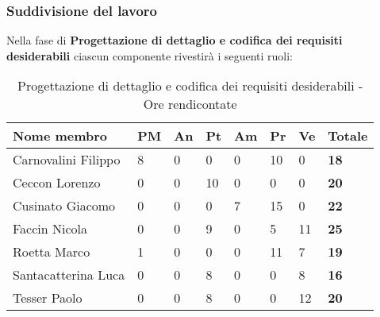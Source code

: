 		\subsubsection{Suddivisione del lavoro} %
		\label{ssub:suddivisione_del_lavoro}
		Nella fase di \textbf{Progettazione di dettaglio e codifica dei requisiti desiderabili} ciascun componente rivestirà i seguenti ruoli: \\
			\begin{table}[!h]
				\begin{center}
					\begin{tabularx}{0.9\textwidth}{|l|l|l|l|l|l|l|X|}
						\hline
						\textbf{Nome membro} & \textbf{PM} & \textbf{An} & \textbf{Pt} & \textbf{Am} & \textbf{Pr} & \textbf{Ve} & \textbf{Totale} \\
						\hline
						Carnovalini Filippo & 8 & 0 & 0 & 0 & 10 & 0 & \textbf{18} \\
						\hline
						Ceccon Lorenzo & 0 & 0 & 10 & 0 & 0 & 0 & \textbf{20} \\
						\hline
						Cusinato Giacomo & 0 & 0 & 0 & 7 & 15 & 0 & \textbf{22} \\
						\hline
						Faccin Nicola & 0 & 0 & 9 & 0 & 5 & 11 & \textbf{25} \\
						\hline
						Roetta Marco & 1 & 0 & 0 & 0 & 11 & 7 & \textbf{19} \\
						\hline
						Santacatterina Luca & 0 & 0 & 8 & 0 & 0 & 8 & \textbf{16} \\
						\hline
						Tesser Paolo & 0 & 0 & 8 & 0 & 0 & 12 & \textbf{20} \\
						\hline	
					\end{tabularx}
				\end{center}
			\caption{Progettazione di dettaglio e codifica dei requisiti desiderabili - Ore rendicontate}
			\end{table}
		
